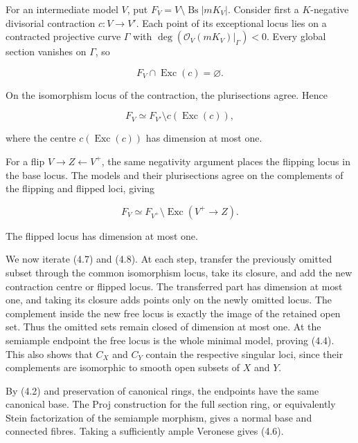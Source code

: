 \documentclass[11pt,a4paper]{article}
\begin{document}
For an intermediate model $V$, put $F_V=V\setminus\operatorname{Bs}|mK_V|$. Consider first a $K$-negative divisorial contraction $c:V\to V'$. Each point of its exceptional locus lies on a contracted projective curve $\Gamma$ with $\deg(\mathcal O_V(mK_V)|_\Gamma)<0$. Every global section vanishes on $\Gamma$, so

\begin{equation*}
F_V\cap\operatorname{Exc}(c)=\varnothing.
\end{equation*}

On the isomorphism locus of the contraction, the plurisections agree. Hence

\begin{equation*}
F_V\simeq F_{V'}\setminus c(\operatorname{Exc}(c)),
\tag{4.7}
\end{equation*}

where the centre $c(\operatorname{Exc}(c))$ has dimension at most one.

For a flip $V\to Z\leftarrow V^+$, the same negativity argument places the flipping locus in the base locus. The models and their plurisections agree on the complements of the flipping and flipped loci, giving

\begin{equation*}
F_V\simeq F_{V^+}\setminus\operatorname{Exc}(V^+\to Z).
\tag{4.8}
\end{equation*}

The flipped locus has dimension at most one.

We now iterate (4.7) and (4.8). At each step, transfer the previously omitted subset through the common isomorphism locus, take its closure, and add the new contraction centre or flipped locus. The transferred part has dimension at most one, and taking its closure adds points only on the newly omitted locus. The complement inside the new free locus is exactly the image of the retained open set. Thus the omitted sets remain closed of dimension at most one. At the semiample endpoint the free locus is the whole minimal model, proving (4.4). This also shows that $C_X$ and $C_Y$ contain the respective singular loci, since their complements are isomorphic to smooth open subsets of $X$ and $Y$.

By (4.2) and preservation of canonical rings, the endpoints have the same canonical base. The Proj construction for the full section ring, or equivalently Stein factorization of the semiample morphism, gives a normal base and connected fibres. Taking a sufficiently ample Veronese gives (4.6).
\end{document}
